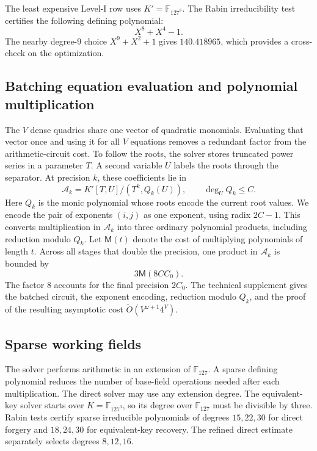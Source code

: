\documentclass[11pt,a4paper]{article}
\theoremstyle{definition}
\theoremstyle{remark}
\newcommand{\F}{\mathbb F}
\newcommand{\Mmul}{\mathsf M}
\begin{document}
The least expensive Level-I row uses $K'=\F_{127^8}$.  The Rabin
irreducibility test certifies the following defining polynomial:
\[
 X^8+X^4-1.
\]
The nearby degree-$9$ choice $X^9+X^2+1$ gives $140.418965$, which provides a
cross-check on the optimization.

\subsection{Batching equation evaluation and polynomial multiplication}\label{sec:flat-lifting}

The $V$ dense quadrics share one vector of quadratic monomials.  Evaluating
that vector once and using it for all $V$ equations removes a redundant factor
from the arithmetic-circuit cost.  To follow the roots, the solver stores
truncated power series in a parameter $T$.  A second variable $U$ labels the
roots through the separator.  At precision $k$, these coefficients lie in
\[
 \mathcal A_k=K'[T,U]/(T^k,Q_k(U)),
 \qquad \deg_U Q_k\le C.
\]
Here $Q_k$ is the monic polynomial whose roots encode the current root values.
We encode the pair of exponents $(i,j)$ as one exponent, using radix $2C-1$.
This converts multiplication in $\mathcal A_k$ into three ordinary polynomial
products, including reduction modulo $Q_k$.  Let $\Mmul(t)$ denote the cost of
multiplying polynomials of length $t$.  Across all stages that double the
precision, one product in $\mathcal A_k$ is bounded by
\begin{equation}\label{eq:flat-schedule-bound}
 3\Mmul(8CC_0).
\end{equation}
The factor $8$ accounts for the final precision $2C_0$.  The technical
supplement gives the batched circuit, the exponent encoding, reduction modulo
$Q_k$, and the proof of the resulting asymptotic cost
$\widetilde O(V^{\omega+1}4^V)$.

\subsection{Sparse working fields}\label{sec:sparse-fields}

The solver performs arithmetic in an extension of $\F_{127}$.  A sparse
defining polynomial reduces the number of base-field operations needed after
each multiplication.  The direct solver may use any extension degree.  The
equivalent-key solver starts over $K=\F_{127^3}$, so its degree over
$\F_{127}$ must be divisible by three.  Rabin tests certify sparse irreducible
polynomials of degrees $15,22,30$ for direct forgery and $18,24,30$ for
equivalent-key recovery.  The refined direct estimate separately selects
degrees $8,12,16$.
\end{document}
